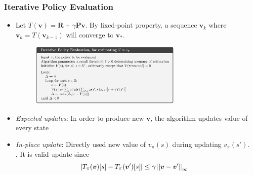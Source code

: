 \documentclass[10pt]{beamer}
\DeclarePairedDelimiter\abs{\lvert}{\rvert}%
\newcommand\norm[1]{\left\lVert#1\right\rVert}
\theoremstyle{remark}
\begin{document}
\begin{frame}
    \frametitle{Iterative Policy Evaluation}
    \begin{itemize}
        \item Let $T(\bm{v}) = \bm{R} + \gamma \bm{P} \bm{v}$. By fixed-point property, a sequence $\bm{v}_k$ where  $\bm{v}_k = T(\bm{v}_{k-1})$ will converge to $\bm{v}_{\ast}$.
    \begin{figure}
        \centering
        \includegraphics[width=0.7\textwidth]{figures/iterative_policy_evaluation.png}
    \end{figure}

        \item \textit{Expected updates}: In order to produce new $\bm{v}$, the algorithm updates value of every state
        \item \textit{In-place update}: Directly used new value of $v_\pi(s)$ during updating $v_\pi(s')$. . It is valid update since
         \[ \abs{T_{\pi}(\bm{v})[s] - T_{\pi}(\bm{v}')[s]} 
             \leq  \gamma \norm{ \bm{v} - \bm{v}' }_{\infty} \] 
    \end{itemize}
\end{frame}
\end{document}
